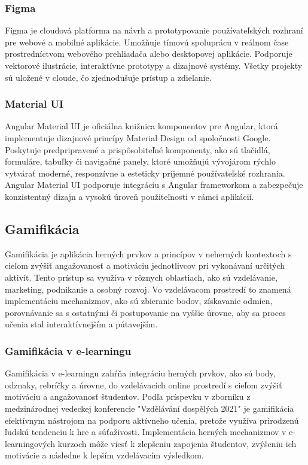 \subsubsection{Figma}
Figma je cloudová platforma na návrh a prototypovanie používateľských rozhraní pre webové a mobilné aplikácie. 
Umožňuje tímovú spoluprácu v reálnom čase prostredníctvom webového prehliadača alebo desktopovej aplikácie. Podporuje vektorové ilustrácie, interaktívne prototypy a dizajnové systémy.
 Všetky projekty sú uložené v cloude, čo zjednodušuje prístup a zdieľanie. \cite{figma}
 \subsubsection{Material UI}
 Angular Material UI je oficiálna knižnica komponentov pre Angular, ktorá implementuje dizajnové princípy Material Design od spoločnosti Google. 
 Poskytuje predpripravené a prispôsobiteľné komponenty, ako sú tlačidlá, formuláre, tabuľky či navigačné panely, ktoré umožňujú vývojárom rýchlo vytvárať moderné, responzívne a esteticky príjemné používateľské rozhrania.
  Angular Material UI podporuje integráciu s Angular frameworkom a zabezpečuje konzistentný dizajn a vysokú úroveň použiteľnosti v rámci aplikácií. \cite{materialUI}

\subsection{Gamifikácia}
Gamifikácia je aplikácia herných prvkov a princípov v neherných kontextoch s cieľom zvýšiť angažovanosť a motiváciu jednotlivcov pri vykonávaní určitých aktivít.
 Tento prístup sa využíva v rôznych oblastiach, ako sú vzdelávanie, marketing, podnikanie a osobný rozvoj.
Vo vzdelávacom prostredí to znamená implementáciu mechanizmov, ako sú zbieranie bodov, získavanie odmien, porovnávanie sa s ostatnými či postupovanie na vyššie úrovne, aby sa proces učenia stal interaktívnejším a pútavejším. 
\subsubsection{Gamifikácia v e-learningu}
Gamifikácia v e-learningu zahŕňa integráciu herných prvkov, ako sú body, odznaky, rebríčky a úrovne, do vzdelávacích online prostredí s cieľom zvýšiť motiváciu a angažovanosť študentov.
 Podľa príspevku v zborníku z medzinárodnej vedeckej konferencie "Vzdělávání dospělých 2021" \cite{gamifikacia} je gamifikácia efektívnym nástrojom na podporu aktívneho učenia, pretože využíva prirodzenú ľudskú tendenciu k hre a súťaživosti.
  Implementácia herných mechanizmov v e-learningových kurzoch môže viesť k zlepšeniu zapojenia študentov, zvýšeniu ich motivácie a následne k lepším vzdelávacím výsledkom.

